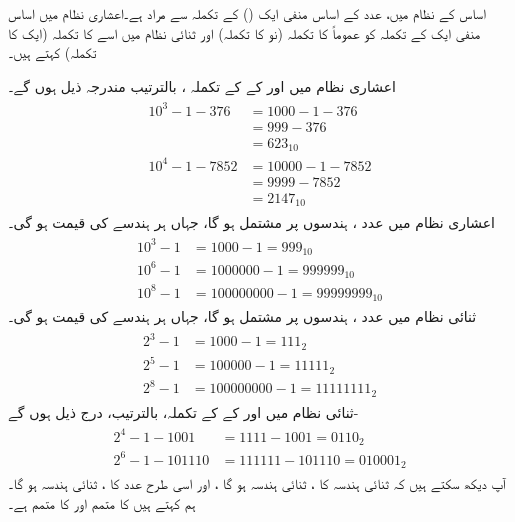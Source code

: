 اساس  کے نظام میں، عدد کے اساس منفی ایک () کے تکملہ سے مراد  ہے۔اعشاری نظام میں اساس منفی ایک کے تکملہ کو عموماً  کا تکملہ (نو کا تکملہ) اور ثنائی نظام میں اسے  کا تکملہ (ایک کا تکملہ) کہتے ہیں۔
 
اعشاری نظام میں  اور  کے  کے تکملہ ، بالترتیب مندرجہ ذیل ہوں گے۔ 
\begin{gather}
\begin{aligned}
10^3-1-376&=1000-1-376\\
&=999-376\\
&=623_{10}\\
10^4-1-7852&=10000-1-7852\\
&=9999-7852\\
&=2147_{10}
\end{aligned}
\end{gather}
اعشاری نظام میں عدد  ،  ہندسوں پر مشتمل ہو گا، جہاں ہر ہندسے کی قیمت  ہو گی۔
\begin{gather}
\begin{aligned}
10^3-1&=1000-1=999_{10}\\
10^6-1&=1000000-1=999999_{10}\\
10^8-1&=100000000-1=99999999_{10}
\end{aligned}
\end{gather}
ثنائی نظام میں عدد  ،  ہندسوں پر مشتمل ہو گا، جہاں ہر ہندسے کی قیمت  ہو گی۔
\begin{gather}
\begin{aligned}
2^3-1&=1000-1=111_{2}\\
2^5-1&=100000-1=11111_{2}\\
2^8-1&=100000000-1=11111111_{2}
\end{aligned}
\end{gather}
 ثنائی نظام میں  اور  کے  کے تکملہ، بالترتیب، درج ذیل ہوں گے- 
\begin{gather}
\begin{aligned}
2^4-1-1001&=1111-1001=0110_2\\
2^6-1-101110&=111111-101110=010001_2
\end{aligned}
\end{gather}
آپ دیکھ سکتے ہیں کہ ثنائی ہندسہ  کا ، ثنائی ہندسہ  ہو گا ، اور اسی طرح عدد  کا ، ثنائی ہندسہ  ہو گا۔ ہم کہتے ہیں  کا متمم  اور  کا متمم  ہے۔

